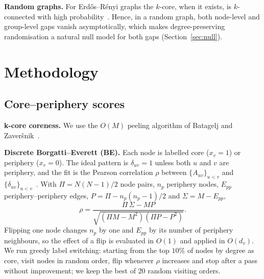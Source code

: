 \documentclass[conference]{IEEEtran}
\begin{document}
\textbf{Random graphs.} For Erd\H{o}s--R\'enyi graphs the $k$-core, when it exists, is
$k$-connected with high probability~\cite{luczak1991size}. Hence, in a random graph, both node-level
and group-level gaps vanish asymptotically, which makes degree-preserving randomisation a natural null
model for both gaps (Section~\ref{sec:null}).

\section{Methodology}
\label{sec:methods}

\subsection{Core--periphery scores}
\textbf{k-core coreness.} We use the $O(M)$ peeling algorithm of Batagelj and
Zaver\v{s}nik~\cite{batagelj2003cores}.

\textbf{Discrete Borgatti--Everett (BE).} Each node is labelled core ($x_v=1$) or periphery
($x_v=0$). The ideal pattern is $\delta_{uv}=1$ unless both $u$ and $v$ are periphery, and the fit is the
Pearson correlation $\rho$ between $\{A_{uv}\}_{u<v}$ and $\{\delta_{uv}\}_{u<v}$~\cite{borgatti2000models}.
With $\Pi=N(N-1)/2$ node pairs, $n_p$ periphery nodes, $E_{pp}$ periphery--periphery edges,
$P=\Pi-n_p(n_p-1)/2$ and $\Sigma=M-E_{pp}$,
\begin{equation}
\rho=\frac{\Pi\,\Sigma-M P}{\sqrt{(\Pi M-M^2)(\Pi P-P^2)}}.
\label{eq:be}
\end{equation}
Flipping one node changes $n_p$ by one and $E_{pp}$ by its number of periphery neighbours, so the effect
of a flip is evaluated in $O(1)$ and applied in $O(d_v)$. We run greedy label switching: starting from the
top $10\%$ of nodes by degree as core, visit nodes in random order, flip whenever $\rho$ increases and
stop after a pass without improvement; we keep the best of $20$ random visiting orders.
\end{document}
